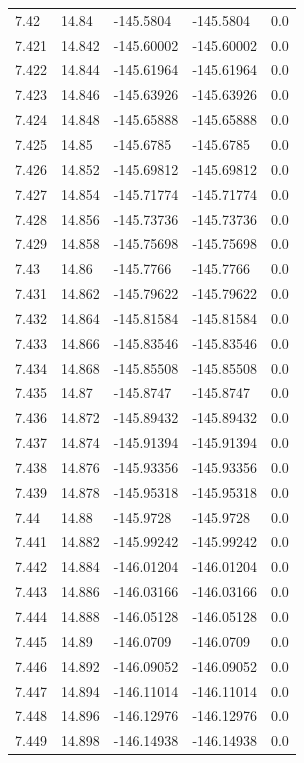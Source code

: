 \begin{tabular}{lllll}
7.42 & 14.84 & -145.5804 & -145.5804 & 0.0 \\
7.421 & 14.842 & -145.60002 & -145.60002 & 0.0 \\
7.422 & 14.844 & -145.61964 & -145.61964 & 0.0 \\
7.423 & 14.846 & -145.63926 & -145.63926 & 0.0 \\
7.424 & 14.848 & -145.65888 & -145.65888 & 0.0 \\
7.425 & 14.85 & -145.6785 & -145.6785 & 0.0 \\
7.426 & 14.852 & -145.69812 & -145.69812 & 0.0 \\
7.427 & 14.854 & -145.71774 & -145.71774 & 0.0 \\
7.428 & 14.856 & -145.73736 & -145.73736 & 0.0 \\
7.429 & 14.858 & -145.75698 & -145.75698 & 0.0 \\
7.43 & 14.86 & -145.7766 & -145.7766 & 0.0 \\
7.431 & 14.862 & -145.79622 & -145.79622 & 0.0 \\
7.432 & 14.864 & -145.81584 & -145.81584 & 0.0 \\
7.433 & 14.866 & -145.83546 & -145.83546 & 0.0 \\
7.434 & 14.868 & -145.85508 & -145.85508 & 0.0 \\
7.435 & 14.87 & -145.8747 & -145.8747 & 0.0 \\
7.436 & 14.872 & -145.89432 & -145.89432 & 0.0 \\
7.437 & 14.874 & -145.91394 & -145.91394 & 0.0 \\
7.438 & 14.876 & -145.93356 & -145.93356 & 0.0 \\
7.439 & 14.878 & -145.95318 & -145.95318 & 0.0 \\
7.44 & 14.88 & -145.9728 & -145.9728 & 0.0 \\
7.441 & 14.882 & -145.99242 & -145.99242 & 0.0 \\
7.442 & 14.884 & -146.01204 & -146.01204 & 0.0 \\
7.443 & 14.886 & -146.03166 & -146.03166 & 0.0 \\
7.444 & 14.888 & -146.05128 & -146.05128 & 0.0 \\
7.445 & 14.89 & -146.0709 & -146.0709 & 0.0 \\
7.446 & 14.892 & -146.09052 & -146.09052 & 0.0 \\
7.447 & 14.894 & -146.11014 & -146.11014 & 0.0 \\
7.448 & 14.896 & -146.12976 & -146.12976 & 0.0 \\
7.449 & 14.898 & -146.14938 & -146.14938 & 0.0 \\

\end{tabular}
